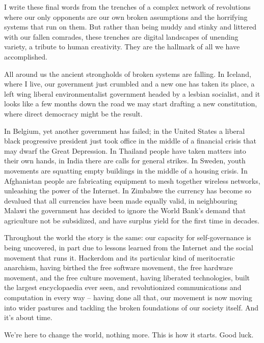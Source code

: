 I write these f\hbox{}inal words from the trenches of a complex network of
revolutions where our only opponents are our own broken assumptions and the
horrifying systems that run on them. But rather than being muddy and stinky and
littered with our fallen comrades, these trenches are digital landscapes of
unending variety, a tribute to human creativity. They are the hallmark of all 
we have accomplished.

All around us the ancient strongholds of broken systems are falling. In 
Iceland, where I live, our government just crumbled and a new one has taken its
place, a left wing liberal environmentalist government headed by a lesbian
socialist, and it looks like a few months down the road we may start drafting a
new constitution, where direct democracy might be the result.

In Belgium, yet another government has failed; in the United States a liberal
black progressive president just took of\hbox{}f\hbox{}ice in the middle of a
f\hbox{}inancial crisis that may dwarf the Great Depression. In Thailand people
have taken matters into their own hands, in India there are calls for general
strikes. In Sweden, youth movements are squatting empty buildings in the middle
of a housing crisis. In Afghanistan people are fabricating equipment to mesh
together wireless networks, unleashing the power of the Internet. In Zimbabwe
the currency has become so devalued that all currencies have been made equally
valid, in neighbouring Malawi the government has decided to ignore the World
Bank's demand that agriculture not be subsidized, and have surplus yield for 
the f\hbox{}irst time in decades.

Throughout the world the story is the same: our capacity for self-governance is
being uncovered, in part due to lessons learned from the Internet and the 
social movement that runs it. Hackerdom and its particular kind of meritocratic
anarchism, having birthed the free software movement, the free hardware
movement, and the free culture movement, having liberated technologies, built
the largest encyclopaedia ever seen, and revolutionized communications and
computation in every way – having done all that, our movement is now moving 
into wider pastures and tackling the broken foundations of our society itself.
And it's about time.

We're here to change the world, nothing more. This is how it starts. Good luck.
